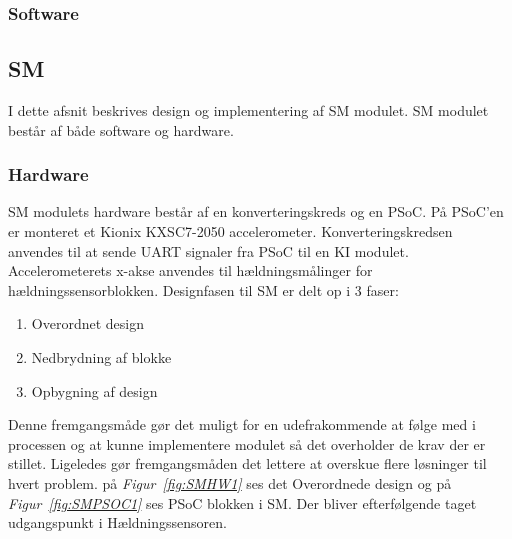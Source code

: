 \subsubsection{Software}


\subsection{SM}
I dette afsnit beskrives design og implementering af SM modulet. SM modulet består af både software og hardware.
\subsubsection{Hardware}
SM modulets hardware består af en konverteringskreds og en PSoC. På PSoC'en er monteret et Kionix KXSC7-2050 accelerometer. Konverteringskredsen anvendes til at sende UART signaler fra PSoC til en KI modulet. Accelerometerets x-akse anvendes til hældningsmålinger for hældningssensorblokken. Designfasen til SM er delt op i 3 faser:
\begin{enumerate}
\item Overordnet design
\item Nedbrydning af blokke
\item Opbygning af design
\end{enumerate}
Denne fremgangsmåde gør det muligt for en udefrakommende at følge med i processen og at kunne implementere modulet så det overholder de krav der er stillet. Ligeledes gør fremgangsmåden det lettere at overskue flere løsninger til hvert problem. på \textit{Figur~\ref{fig:SMHW1}} ses det Overordnede design og på \textit{Figur~\ref{fig:SMPSOC1}} ses PSoC blokken i SM. Der bliver efterfølgende taget udgangspunkt i Hældningssensoren. \\
